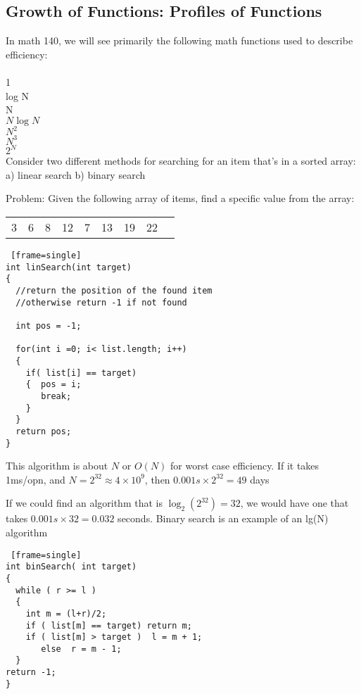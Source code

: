 \documentclass[14pt]{article} %
\begin{document}
\subsection{Growth of Functions: Profiles of Functions}
In math 140, we will see primarily the following math functions used to describe efficiency:
\\  \\
1 \\
log N \\
N \\
$N \log N$ \\
$N^2$ \\
$N^3$ \\
$2^N$ \\




Consider two different methods for searching for an item that's in a sorted array:
a) linear search
b) binary search

Problem:
Given the following array of items, find a specific value from the array:


\begin{tabular} { |c | c  | c | c | c  | c | c | c  | c |   }
3 & 6 &  8 & 12 & 7 & 13 & 19 & 22    \\ 
\end{tabular}




\begin{lstlisting} [frame=single]
int linSearch(int target)
{
  //return the position of the found item
  //otherwise return -1 if not found

  int pos = -1;

  for(int i =0; i< list.length; i++)
  {
    if( list[i] == target)
    {  pos = i;
       break;
    }
  }
  return pos;
}
\end{lstlisting}



This algorithm is about $N$ or $O(N)$ for worst case efficiency.
If it takes 1ms/opn, and $N = 2^{32} \approx 4 \times10^9$, then $0.001s \times 2^{32} = 49$ days


If we could find an algorithm that is $\log_2(2^{32}) = 32$, we would have one that takes $0.001s \times 32= 0.032$ seconds.  Binary search is an example of an lg(N) algorithm

\begin{lstlisting} [frame=single]
int binSearch( int target)
{
  while ( r >= l )
  {
    int m = (l+r)/2;
    if ( list[m] == target) return m;
    if ( list[m] > target )  l = m + 1;
       else  r = m - 1;
  }
return -1;
}
 \end{lstlisting}
 
\end{document}
